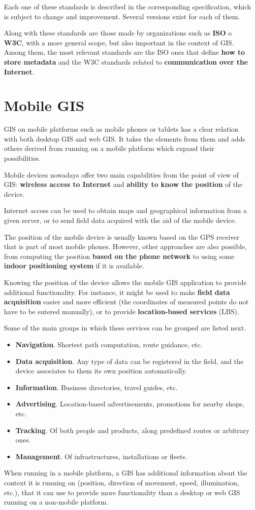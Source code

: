 Each one of these standards is described in the corresponding specification, which is subject to change and improvement. Several versions exist for each of them.

Along with these standards are those made by organizations such as \textbf{ISO} o \textbf{W3C}, with a more general scope, but also important in the context of GIS. Among them, the most relevant standards are the ISO ones that define \textbf{how to store metadata} and the W3C standards related to \textbf{communication over the Internet}.

\section{Mobile GIS}

GIS on mobile platforms such as mobile phones or tablets has a clear relation with both desktop GIS and web GIS. It takes the elements from them and adds others derived from running on a mobile platform which expand their possibilities.

Mobile devices nowadays offer two main capabilities from the point of view of GIS: \textbf{wireless access to Internet} and \textbf{ability to know the position} of the device. 

Internet access can be used to obtain maps and geographical information from a given server, or to send field data acquired with the aid of the mobile device.

The position of the mobile device is usually known based on the GPS receiver that is part of most mobile phones. However, other approaches are also possible, from computing the position \textbf{based on the phone network} to using some \textbf{indoor positioning system} if it is available.

Knowing the position of the device allows the mobile GIS application to provide additional functionality. For instance, it might be used to make \textbf{field data acquisition} easier and more efficient (the coordinates of measured points do not have to be entered manually), or to provide \textbf{location-based services} (LBS).  

Some of the main groups in which these services can be grouped are listed next.

\begin{itemize}
	\item \textbf{Navigation}. Shortest path computation, route guidance, etc.
\item \textbf{Data acquisition}. Any type of data can be registered in the field, and the device associates to them its own position automatically.
\item \textbf{Information}. Business directories, travel guides, etc.
\item \textbf{Advertising}. Location-based advertisements, promotions for nearby shops, etc.
\item \textbf{Tracking}. Of both people and products, along predefined routes or arbitrary ones.
\item \textbf{Management}. Of infrastructures, installations or fleets.
\end{itemize}

When running in a mobile platform, a GIS has additional information about the context it is running on (position, direction of movement, speed, illumination, etc.), that it can use to provide more functionality than a desktop or web GIS running on a non-mobile platform.

\pagestyle{empty}
